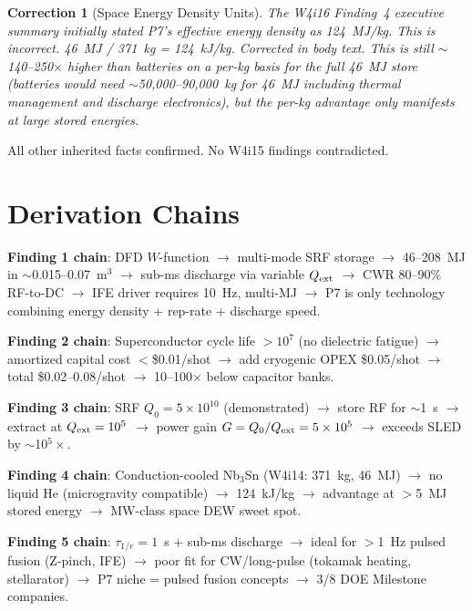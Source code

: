 \documentclass[11pt]{article}
\newtheorem{correction}{Correction}
\newcommand{\ee}[1]{\times 10^{#1}}
\begin{document}
\begin{correction}[Space Energy Density Units]
\label{corr:units}
The W4i16 Finding~4 executive summary initially stated P7's effective
energy density as 124~MJ/kg. This is incorrect. 46~MJ / 371~kg
= 124~kJ/kg. Corrected in body text. This is still $\sim$140--250$\times$
higher than batteries on a per-kg basis for the full 46~MJ store
(batteries would need $\sim$50,000--90,000~kg for 46~MJ including
thermal management and discharge electronics), but the per-kg
advantage only manifests at large stored energies.
\end{correction}

All other inherited facts confirmed. No W4i15 findings contradicted.

\section{Derivation Chains}
\label{sec:chains}

\textbf{Finding 1 chain}:
DFD $W$-function $\to$ multi-mode SRF storage $\to$ 46--208~MJ
in $\sim$0.015--0.07~m$^3$ $\to$ sub-ms discharge via variable
$Q_{\rm ext}$ $\to$ CWR 80--90\% RF-to-DC $\to$ IFE driver
requires 10~Hz, multi-MJ $\to$ P7 is only technology combining
energy density + rep-rate + discharge speed.

\textbf{Finding 2 chain}:
Superconductor cycle life $>10^7$ (no dielectric fatigue) $\to$
amortized capital cost $<$\$0.01/shot $\to$ add cryogenic OPEX
\$0.05/shot $\to$ total \$0.02--0.08/shot $\to$ 10--100$\times$
below capacitor banks.

\textbf{Finding 3 chain}:
SRF $Q_0 = 5\ee{10}$ (demonstrated) $\to$ store RF for $\sim$1~s
$\to$ extract at $Q_{\rm ext} = 10^5$ $\to$ power gain
$G = Q_0/Q_{\rm ext} = 5\ee{5}$ $\to$ exceeds SLED by
$\sim$10$^5\times$.

\textbf{Finding 4 chain}:
Conduction-cooled Nb$_3$Sn (W4i14: 371~kg, 46~MJ) $\to$
no liquid He (microgravity compatible) $\to$ 124~kJ/kg
$\to$ advantage at $>$5~MJ stored energy $\to$
MW-class space DEW sweet spot.

\textbf{Finding 5 chain}:
$\tau_{1/e} = 1$~s + sub-ms discharge $\to$ ideal for
$>$1~Hz pulsed fusion (Z-pinch, IFE) $\to$ poor fit for
CW/long-pulse (tokamak heating, stellarator) $\to$ P7
niche = pulsed fusion concepts $\to$ 3/8 DOE Milestone
companies.
\end{document}
